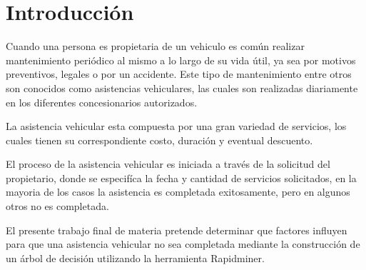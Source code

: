 \section{Introducci\'on}
Cuando una persona es propietaria de un vehiculo es com\'un realizar mantenimiento
peri\'odico al mismo a lo largo de su vida \'util, ya sea por motivos preventivos,
legales o por un accidente. Este tipo de mantenimiento entre otros son conocidos como
asistencias vehiculares, las cuales son realizadas diariamente en los diferentes
concesionarios autorizados.

La asistencia vehicular esta compuesta por una gran variedad de servicios, los cuales
tienen su correspondiente costo, duraci\'on y eventual descuento.

El proceso de la asistencia vehicular es iniciada a trav\'es de la solicitud del propietario,
donde se especif\'ica la fecha y cantidad de servicios solicitados, en la mayoria de los
casos la asistencia es completada exitosamente, pero en algunos otros no es completada.

El presente trabajo final de materia pretende determinar que factores influyen para que
una asistencia vehicular no sea completada mediante la construcci\'on de un \'arbol de
decisi\'on utilizando la herramienta Rapidminer.

